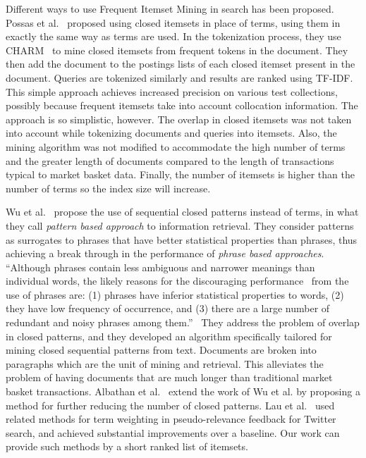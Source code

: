 \documentclass[letterpaper,12pt,titlepage,oneside,final]{book}
\begin{document}
Different ways to use Frequent Itemset Mining in search %
has been proposed. 
Possas et al.~\cite{possas2002set}  proposed using closed itemsets
in place of terms, using them in exactly the same way as terms are used.
In the tokenization process, they use CHARM~\cite{zaki2002charm} to mine closed itemsets from 
frequent tokens in the document.
They then add the document to the postings lists of each closed itemset
present in the document. 
Queries are tokenized similarly and results are ranked using TF-IDF.
This simple approach achieves increased precision on various test collections, 
possibly because frequent itemsets take into account collocation information.
The approach is so simplistic, however. 
The overlap in closed itemsets was not taken into account while tokenizing documents and queries into itemsets.
Also, the mining algorithm was not modified to accommodate the high number of terms %
and the greater length of documents compared to the length of transactions typical to market basket data.
Finally, the number of itemsets is higher than the number of terms so the index size will increase.

Wu et al.~\cite{wu2004automatic,wu2006deploying}
propose the use of sequential closed patterns instead of terms, 
in what they call \emph{pattern based approach} to information retrieval.
They consider patterns as surrogates to phrases that have
better statistical properties than phrases, 
thus achieving a break through in the performance 
of \emph{phrase based approaches}.
``Although phrases contain less ambiguous and narrower meanings than individual words, the likely
reasons for the discouraging performance~\cite{lewis1992evaluation} from the use of phrases are: (1) phrases have inferior statistical properties to words, (2) they have low frequency of occurrence, and (3) there are a large number of redundant and noisy phrases among them.''~\cite{wu2006deploying}
They address the problem of overlap in closed patterns,
and they developed an algorithm specifically tailored for mining closed sequential patterns from text.
Documents are broken into paragraphs which are the unit of mining and retrieval.
This alleviates the problem of having documents that are much longer than traditional market basket transactions.
Albathan et al.~\cite{albathan2012using} extend the work of Wu et al. by 
proposing a method for further reducing the number of closed patterns.
Lau et al.~\cite{laumicroblog} used related methods for term weighting 
in pseudo-relevance feedback for Twitter search,
and achieved substantial improvements over a baseline.
Our work can provide such methods by a short ranked list of itemsets. 
\end{document}
